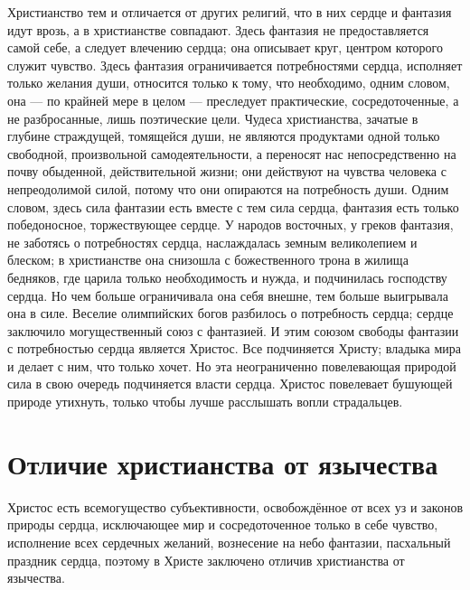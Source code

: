 \documentclass[12pt,oneside]{book}
\begin{document}
Христианство тем и отличается от других религий, что в них сердце и фантазия идут врозь, а в христианстве совпадают. Здесь фантазия не предоставляется самой себе, а следует влечению сердца; она описывает круг, центром которого служит чувство. Здесь фантазия ограничивается потребностями сердца, исполняет только желания души, относится только к тому, что необходимо, одним словом, она --- по крайней мере в целом --- преследует практические, сосредоточенные, а не разбросанные, лишь поэтические цели. Чудеса христианства, зачатые в глубине страждущей, томящейся души, не являются продуктами одной только свободной, произвольной самодеятельности, а переносят нас непосредственно на почву обыденной, действительной жизни; они действуют на чувства человека с непреодолимой силой, потому что они опираются на потребность души. Одним словом, здесь сила фантазии есть вместе с тем сила сердца, фантазия есть только победоносное, торжествующее сердце. У народов восточных, у греков фантазия, не заботясь о потребностях сердца, наслаждалась земным великолепием и блеском; в христианстве она снизошла с божественного трона в жилища бедняков, где царила только необходимость и нужда, и подчинилась господству сердца. Но чем больше ограничивала она себя внешне, тем больше выигрывала она в силе. Веселие олимпийских богов разбилось о потребность сердца; сердце заключило могущественный союз с фантазией. И этим союзом свободы фантазии с потребностью сердца является Христос. Все подчиняется Христу; владыка мира и делает с ним, что только хочет. Но эта неограниченно повелевающая природой сила в свою очередь подчиняется власти сердца. Христос повелевает бушующей природе утихнуть, только чтобы лучше расслышать вопли страдальцев.




\chapter{Отличие христианства от язычества}


Христос есть всемогущество субъективности, освобождённое от всех уз и законов природы сердца, исключающее мир и сосредоточенное только в себе чувство, исполнение всех сердечных желаний, вознесение на небо фантазии, пасхальный праздник сердца, поэтому в Христе заключено отличив христианства от язычества.
\end{document}
